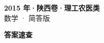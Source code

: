 \documentclass[zihao=-4, a4paper]{ctexart}
\begin{document}
\begin{center}
  {\Large\bfseries 2015 年·陕西卷·理工农医类}\\[4pt]
  {\large 数学 · 简答版}
\end{center}
\medskip
{}

\clearpage
{}
\begin{center}{\Large\bfseries 答案速查}\end{center}
\medskip

\end{document}
